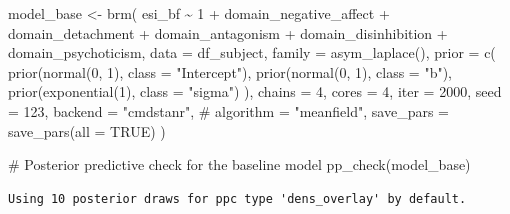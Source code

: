 \documentclass[
  11pt,
  a4paper,
  onecolumn]{article}
\newenvironment{Shaded}{}{}
\newcommand{\AttributeTok}[1]{\textcolor[rgb]{0.84,0.23,0.29}{#1}}
\newcommand{\CommentTok}[1]{\textcolor[rgb]{0.42,0.45,0.49}{#1}}
\newcommand{\ConstantTok}[1]{\textcolor[rgb]{0.00,0.36,0.77}{#1}}
\newcommand{\DecValTok}[1]{\textcolor[rgb]{0.00,0.36,0.77}{#1}}
\newcommand{\FunctionTok}[1]{\textcolor[rgb]{0.44,0.26,0.76}{#1}}
\newcommand{\NormalTok}[1]{\textcolor[rgb]{0.14,0.16,0.18}{#1}}
\newcommand{\OtherTok}[1]{\textcolor[rgb]{0.44,0.26,0.76}{#1}}
\newcommand{\SpecialCharTok}[1]{\textcolor[rgb]{0.00,0.36,0.77}{#1}}
\newcommand{\StringTok}[1]{\textcolor[rgb]{0.01,0.18,0.38}{#1}}
\begin{document}
\begin{Shaded}
\begin{Highlighting}[]
\NormalTok{model\_base }\OtherTok{\textless{}{-}} \FunctionTok{brm}\NormalTok{(}
\NormalTok{  esi\_bf }\SpecialCharTok{\textasciitilde{}} \DecValTok{1} \SpecialCharTok{+} 
\NormalTok{    domain\_negative\_affect }\SpecialCharTok{+}\NormalTok{ domain\_detachment }\SpecialCharTok{+}
\NormalTok{    domain\_antagonism }\SpecialCharTok{+}\NormalTok{ domain\_disinhibition }\SpecialCharTok{+}\NormalTok{ domain\_psychoticism,}
  \AttributeTok{data =}\NormalTok{ df\_subject,}
  \AttributeTok{family =} \FunctionTok{asym\_laplace}\NormalTok{(),}
  \AttributeTok{prior =} \FunctionTok{c}\NormalTok{(}
    \FunctionTok{prior}\NormalTok{(}\FunctionTok{normal}\NormalTok{(}\DecValTok{0}\NormalTok{, }\DecValTok{1}\NormalTok{), }\AttributeTok{class =} \StringTok{"Intercept"}\NormalTok{),}
    \FunctionTok{prior}\NormalTok{(}\FunctionTok{normal}\NormalTok{(}\DecValTok{0}\NormalTok{, }\DecValTok{1}\NormalTok{), }\AttributeTok{class =} \StringTok{"b"}\NormalTok{),}
    \FunctionTok{prior}\NormalTok{(}\FunctionTok{exponential}\NormalTok{(}\DecValTok{1}\NormalTok{), }\AttributeTok{class =} \StringTok{"sigma"}\NormalTok{)}
\NormalTok{  ),}
  \AttributeTok{chains =} \DecValTok{4}\NormalTok{,}
  \AttributeTok{cores =} \DecValTok{4}\NormalTok{,}
  \AttributeTok{iter =} \DecValTok{2000}\NormalTok{,}
  \AttributeTok{seed =} \DecValTok{123}\NormalTok{,}
  \AttributeTok{backend =} \StringTok{"cmdstanr"}\NormalTok{,}
  \CommentTok{\# algorithm = "meanfield",}
  \AttributeTok{save\_pars =} \FunctionTok{save\_pars}\NormalTok{(}\AttributeTok{all =} \ConstantTok{TRUE}\NormalTok{)}
\NormalTok{)}
\end{Highlighting}
\end{Shaded}

\begin{Shaded}
\begin{Highlighting}[]
\CommentTok{\# Posterior predictive check for the baseline model}
\FunctionTok{pp\_check}\NormalTok{(model\_base)}
\end{Highlighting}
\end{Shaded}

\begin{verbatim}
Using 10 posterior draws for ppc type 'dens_overlay' by default.
\end{verbatim}
\end{document}
